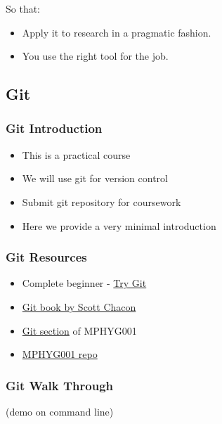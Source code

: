 So that:

\begin{itemize}
\itemsep1pt\parskip0pt
\item
  Apply it to research in a pragmatic fashion.
\item
  You use the right tool for the job.
\end{itemize}

\subsection{Git}\label{git}

\subsubsection{Git Introduction}\label{git-introduction}

\begin{itemize}
\itemsep1pt\parskip0pt
\item
  This is a practical course
\item
  We will use git for version control
\item
  Submit git repository for coursework
\item
  Here we provide a very minimal introduction
\end{itemize}

\subsubsection{Git Resources}\label{git-resources}

\begin{itemize}
\itemsep1pt\parskip0pt
\item
  Complete beginner - \href{https://try.github.io}{Try Git}
\item
  \href{https://git-scm.com/book/en/v2}{Git book by Scott Chacon}
\item
  \href{http://github-pages.ucl.ac.uk/rsd-engineeringcourse/ch02git/}{Git
  section} of MPHYG001
\item
  \href{https://github.com/UCL/rsd-engineeringcourse}{MPHYG001 repo}
\end{itemize}

\subsubsection{Git Walk Through}\label{git-walk-through}

(demo on command line)

